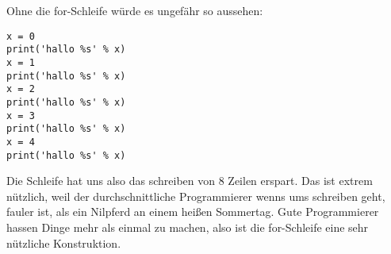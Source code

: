 Ohne die for-Schleife würde es ungefähr so aussehen:

\begin{listing}
\begin{verbatim}
x = 0
print('hallo %s' % x)
x = 1
print('hallo %s' % x)
x = 2
print('hallo %s' % x)
x = 3
print('hallo %s' % x)
x = 4
print('hallo %s' % x)
\end{verbatim}
\end{listing}

Die Schleife hat uns also das schreiben von 8 Zeilen erspart. Das ist extrem nützlich, weil der durchschnittliche Programmierer wenns ums schreiben geht, fauler ist, als ein Nilpferd an einem heißen Sommertag. Gute Programmierer hassen Dinge mehr als einmal zu machen, also ist die for-Schleife eine sehr nützliche Konstruktion.

